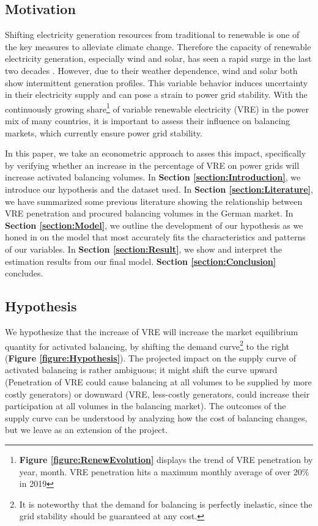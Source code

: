 \documentclass[12pt]{article}
\begin{document}
\subsection{Motivation}
Shifting electricity generation resources from traditional to renewable is one of the key measures to alleviate climate change. Therefore the capacity of renewable electricity generation, especially wind and solar, has seen a rapid surge in the last two decades \citep[p. 293]{weo2018}. However, due to their weather dependence, wind and solar both show intermittent generation profiles. This variable behavior induces uncertainty in their electricity supply and can pose a strain to power grid stability. With the continuously growing share\footnote{\textbf{Figure \ref{figure:RenewEvolution}} displays the trend of VRE penetration by year, month. VRE penetration hits a maximum monthly average of over 20\% in 2019} of variable renewable electricity (VRE) in the power mix of many countries, it is important to assess their influence on balancing markets, which currently ensure power grid stability.\par

In this paper, we take an econometric approach to asses this impact, specifically by verifying whether an increase in the percentage of VRE on power grids will increase activated balancing volumes. In \textbf{Section \ref{section:Introduction}}, we introduce our hypothesis and the dataset used. In \textbf{Section \ref{section:Literature}}, we have summarized some previous literature showing the relationship between VRE penetration and procured balancing volumes in the German market. In \textbf{Section \ref{section:Model}}, we outline the development of our hypothesis as we honed in on the model that most accurately fits the characteristics and patterns of our variables. In \textbf{Section \ref{section:Result}}, we show and interpret the estimation results from our final model. \textbf{Section \ref{section:Conclusion}} concludes. \par

\subsection{Hypothesis}
We hypothesize that the increase of VRE will increase the market equilibrium quantity for activated balancing, by shifting the demand curve\footnote{It is noteworthy that the demand for balancing is perfectly inelastic, since the grid stability should be guaranteed at any cost.} to the right (\textbf{Figure \ref{figure:Hypothesis}}). The projected impact on the supply curve of activated balancing is rather ambiguous; it might shift the curve upward (Penetration of VRE could cause balancing at all volumes to be supplied by more costly generators) or downward (VRE, less-costly generators, could increase their participation at all volumes in the balancing market). The outcomes of the supply curve can be understood by analyzing how the cost of balancing changes, but we leave as an extension of the project.\par
\end{document}
